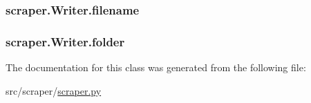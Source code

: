 \subsubsection[{\texorpdfstring{filename}{filename}}]{\setlength{\rightskip}{0pt plus 5cm}scraper.\+Writer.\+filename}\hypertarget{classscraper_1_1_writer_a5e6006cfece3245121900edb8054de7e}{}\label{classscraper_1_1_writer_a5e6006cfece3245121900edb8054de7e}
\subsubsection[{\texorpdfstring{folder}{folder}}]{\setlength{\rightskip}{0pt plus 5cm}scraper.\+Writer.\+folder}\hypertarget{classscraper_1_1_writer_a24df154d5f014a262fad63a36036a861}{}\label{classscraper_1_1_writer_a24df154d5f014a262fad63a36036a861}


The documentation for this class was generated from the following file\+:\begin{DoxyCompactItemize}
\item 
src/scraper/\hyperlink{scraper_8py}{scraper.\+py}\end{DoxyCompactItemize}
